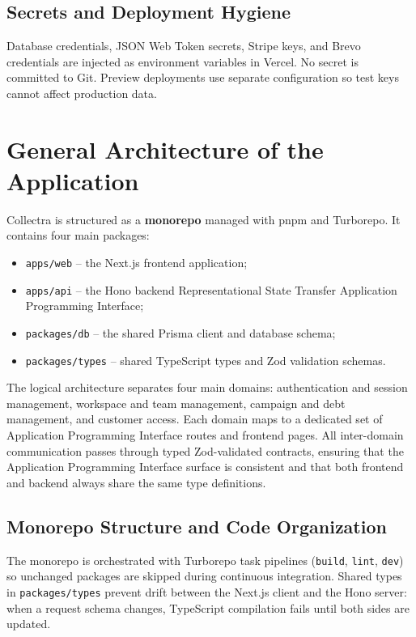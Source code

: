 \documentclass[12pt,a4paper]{report}
\begin{document}
\subsection{Secrets and Deployment Hygiene}

Database credentials, JSON Web Token secrets, Stripe keys, and Brevo credentials are injected
as environment variables in Vercel.
No secret is committed to Git.
Preview deployments use separate configuration so test keys cannot affect production data.

\section{General Architecture of the Application}

Collectra is structured as a \textbf{monorepo} managed with pnpm and Turborepo.
It contains four main packages:
\begin{itemize}
  \item \texttt{apps/web} -- the Next.js frontend application;
  \item \texttt{apps/api} -- the Hono backend Representational State Transfer Application Programming Interface;
  \item \texttt{packages/db} -- the shared Prisma client and database schema;
  \item \texttt{packages/types} -- shared TypeScript types and Zod validation schemas.
\end{itemize}

The logical architecture separates four main domains: authentication and session
management, workspace and team management, campaign and debt management, and customer
access.
Each domain maps to a dedicated set of Application Programming Interface routes and frontend pages.
All inter-domain communication passes through typed Zod-validated contracts, ensuring
that the Application Programming Interface surface is consistent and that both frontend and
backend always share the same type definitions.

\subsection{Monorepo Structure and Code Organization}

The monorepo is orchestrated with Turborepo task pipelines (\texttt{build}, \texttt{lint},
\texttt{dev}) so unchanged packages are skipped during continuous integration.
Shared types in \texttt{packages/types} prevent drift between the Next.js client and the Hono
server: when a request schema changes, TypeScript compilation fails until both sides are updated.
\end{document}
